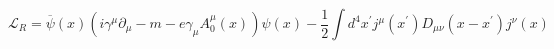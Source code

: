\begin{equation}
\mathcal{L}_{R}=\overline{\psi }(x)\left( i\gamma ^{\mu }\partial _{\mu
}-m-e\gamma _{\mu }A_{0}^{\mu }(x)\right) \psi (x)-\frac{1}{2}\int
d^{4}x^{\prime }j^{\mu }(x^{\prime })D_{\mu \nu }(x-x^{\prime })j^{\nu }(x)
\end{equation}

